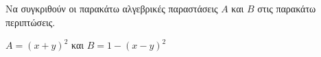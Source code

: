 Να συγκριθούν οι παρακάτω αλγεβρικές παραστάσεις $ A $ και $ B $ στις παρακάτω περιπτώσεις.
\begin{alist}
\item $ A=(x+y)^2 $ και $ B=1-(x-y)^2 $
\item 
\item 
\item 
\end{alist}
